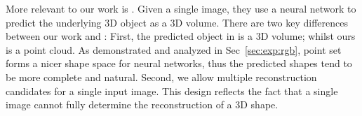 \documentclass[10pt,twocolumn,letterpaper]{article}
\begin{document}
More relevant to our work is \cite{choy20163d}. 
Given a single image, they use a neural network to predict the underlying 3D object as a 3D volume. There are two key differences between our work and \cite{choy20163d}: First, the predicted object in \cite{choy20163d} is a 3D volume; whilst ours is a point cloud. As demonstrated and analyzed in Sec~\ref{sec:exp:rgb}, point set forms a nicer shape space for neural networks, thus the predicted shapes tend to be more complete and natural. Second, we allow multiple reconstruction candidates for a single input image. This design reflects the fact that a single image cannot fully determine the reconstruction of a 3D shape. %
\end{document}
